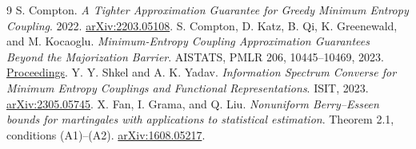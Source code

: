 \documentclass[11pt,a4paper]{article}
\begin{document}
\begin{thebibliography}{9}
 S. Compton.
\emph{A Tighter Approximation Guarantee for Greedy Minimum Entropy
Coupling}. 2022. \href{https://arxiv.org/abs/2203.05108}{arXiv:2203.05108}.
 S. Compton, D. Katz, B. Qi, K. Greenewald, and M. Kocaoglu.
\emph{Minimum-Entropy Coupling Approximation Guarantees Beyond the
Majorization Barrier}. AISTATS, PMLR 206, 10445--10469, 2023.
\href{https://proceedings.mlr.press/v206/compton23a.html}{Proceedings}.
 Y. Y. Shkel and A. K. Yadav.
\emph{Information Spectrum Converse for Minimum Entropy Couplings and
Functional Representations}. ISIT, 2023.
\href{https://arxiv.org/abs/2305.05745}{arXiv:2305.05745}.
 X. Fan, I. Grama, and Q. Liu.
\emph{Nonuniform Berry--Esseen bounds for martingales with applications
to statistical estimation}. Theorem 2.1, conditions (A1)--(A2).
\href{https://arxiv.org/abs/1608.05217}{arXiv:1608.05217}.
\end{thebibliography}
\end{document}
